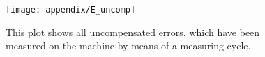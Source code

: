 \begin{figure}[!htb]
    \centering
    \texttt{[image: appendix/E\_uncomp]} %
    \caption[All errors uncompensated]{This plot shows all uncompensated errors, which have been measured on the machine by means of a measuring cycle.}
    \label{fig:Error_all}
\end{figure}




{\scriptsize

}
